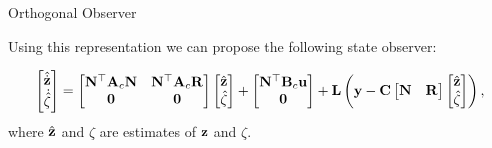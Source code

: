 \documentclass{beamer}
\begin{document}
\begin{frame}{Orthogonal Observer}
	\begin{flushleft}
		
		Using this representation we can propose the following state observer:
		
		\begin{equation*}
			\begin{bmatrix}
				\hat{\dot{\mathbf{z}}} \\ \dot{\hat{\zeta}}
			\end{bmatrix} =
			\begin{bmatrix}
				\mathbf{N}^\top\mathbf{A}_c\mathbf{N} & \mathbf{N}^\top\mathbf{A}_c\mathbf{R}\\ 
				\mathbf{0} & \mathbf{0}
			\end{bmatrix}
			\begin{bmatrix}
				\hat{\mathbf{z}} \\ \hat{\zeta}
			\end{bmatrix}
			+
			\begin{bmatrix}
				\mathbf{N}^\top\mathbf{B}_c\mathbf{u} \\ \mathbf{0}
			\end{bmatrix} 
			+
			\mathbf{L}
			\left(\mathbf{y} - \mathbf{C} 
			\begin{bmatrix}
				\mathbf{N} & \mathbf{R}
			\end{bmatrix}
			\begin{bmatrix}
				\hat{\mathbf{z}} \\ \hat{\zeta}
			\end{bmatrix}
			\right),
		\end{equation*}
		where $\hat{\mathbf{z}}$ and $\hat{\zeta}$ are estimates of $\mathbf{z}$ and $\zeta$.
		
	\end{flushleft}
\end{frame}
\end{document}
